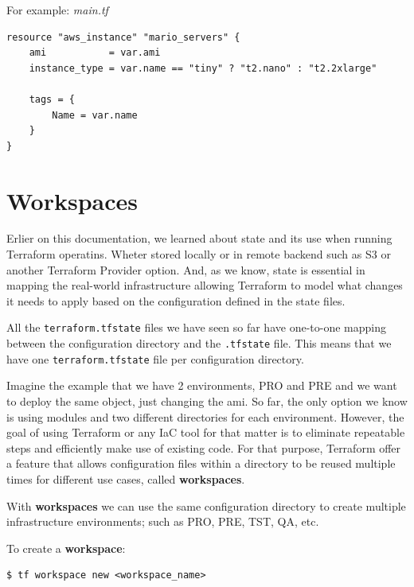 \documentclass{article}
\newenvironment{codetemplate}[1][]{%
  \mybasecolorbox[#1]
  \itshape
}{%
  \endmybasecolorbox
}
\begin{document}
For example:
\begin{codetemplate}{main.tf}
\begin{verbatim}
resource "aws_instance" "mario_servers" {
    ami           = var.ami
    instance_type = var.name == "tiny" ? "t2.nano" : "t2.2xlarge"
    
    tags = {
        Name = var.name
    }
}      
\end{verbatim}
\end{codetemplate}

\section{Workspaces}

Erlier on this documentation, we learned about state and its use when running Terraform operatins. Wheter stored locally or in remote backend such as S3 or another Terraform Provider option. And, as we know, state is essential in mapping the real-world infrastructure allowing Terraform to model what changes it needs to apply based on the configuration defined in the state files. 

All the \verb|terraform.tfstate| files we have seen so far have one-to-one mapping between the configuration directory and the \verb|.tfstate| file. This means that we have one \verb|terraform.tfstate| file per configuration directory.

Imagine the example that we have 2 environments, PRO and PRE and we want to deploy the same object, just changing the ami. So far, the only option we know is using modules and two different directories for each environment. However, the goal of using Terraform or any IaC tool for that matter is to eliminate repeatable steps and efficiently make use of existing code. For that purpose, Terraform offer a feature that allows configuration files within a directory to be reused multiple times for different use cases, called \textbf{workspaces}.

With \textbf{workspaces} we can use the same configuration directory to create multiple infrastructure environments; such as PRO, PRE, TST, QA, etc.

To create a \textbf{workspace}:

\begin{codetemplate}{}
\begin{verbatim}
$ tf workspace new <workspace_name>
\end{verbatim}
\end{codetemplate}
\end{document}
